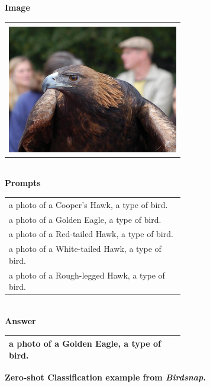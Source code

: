\begin{figure}[h]
\centering
\textbf{Image}

\begin{tabular}{|p{0.7\linewidth}|}
\hline \\
\includegraphics[width=\linewidth,frame]{figures/examples_assests/zeroshot_classification/image.pdf} \\
\hline
\end{tabular}
\\
\textbf{Prompts}
\\
\begin{tabular}{|p{0.7\linewidth}|}
\hline
a photo of a Cooper's Hawk, a type of bird. \\
a photo of a Golden Eagle, a type of bird. \\
a photo of a Red-tailed Hawk, a type of bird. \\
a photo of a White-tailed Hawk, a type of bird. \\
a photo of a Rough-legged Hawk, a type of bird. \\
\hline
\end{tabular}
\\
\textbf{Answer} 
\\
\begin{tabular}{|p{0.7\linewidth}|}
\hline
a photo of a Golden Eagle, a type of bird. \\
\hline
\end{tabular}
\caption{\textbf{Zero-shot Classification example from \emph{Birdsnap}.}}
\label{fig:zeroshot_example}
\end{figure}